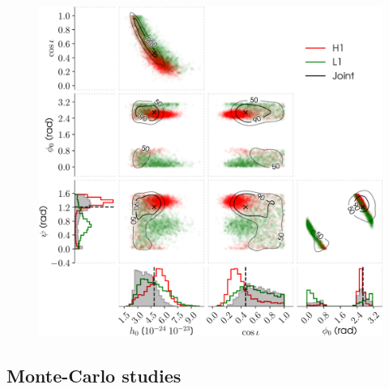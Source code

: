 \begin{figure}[!phtb]
\begin{center}
\includegraphics[width=1\columnwidth]{./figures/codeeval/simulations/S6_hwinj/hwinj05/hwinj05}
\caption{ \protect}
\end{center}
\end{figure}

\subsection{Monte-Carlo studies}

